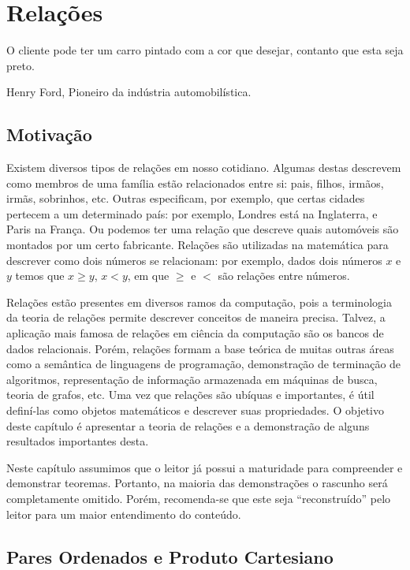 \chapter{Relações}\label{cap7}

\epigraph{O cliente pode ter um carro pintado com a cor que desejar,
  contanto que esta seja preto.}{Henry Ford, Pioneiro da indústria automobilística.}


\section{Motivação}

Existem diversos tipos de relações em nosso cotidiano. Algumas destas
descrevem como membros de uma família estão relacionados entre si:
pais, filhos, irmãos, irmãs, sobrinhos, etc. Outras especificam, por
exemplo, que certas cidades pertecem a um determinado país:
por exemplo, Londres está na Inglaterra, e Paris na França. Ou podemos
ter uma relação que descreve quais automóveis são montados por um
certo fabricante. Relações são utilizadas na matemática para descrever
como dois números se relacionam: por exemplo, dados dois números $x$ e
$y$ temos que $x \geq y$, $x < y$, em que $\geq$ e $<$ são relações
entre números.

Relações estão presentes em diversos ramos da computação, pois a
terminologia da teoria de relações permite descrever conceitos de
maneira precisa. Talvez, a aplicação mais famosa de relações em
ciência da computação são os bancos de dados relacionais. Porém,
relações formam a base teórica de muitas outras áreas como a semântica
de linguagens de programação, demonstração de terminação de
algoritmos, representação de informação armazenada em máquinas de
busca, teoria de grafos, etc. Uma vez que relações são ubíquas e
importantes, é útil definí-las como objetos matemáticos e descrever
suas propriedades. O objetivo deste capítulo é apresentar a teoria de
relações e a demonstração de alguns resultados importantes desta.

\begin{Remark}
Neste capítulo assumimos que o leitor já possui a maturidade para
compreender e demonstrar teoremas. Portanto, na maioria das
demonstrações o rascunho será completamente omitido. Porém,
recomenda-se que este seja ``reconstruído'' pelo leitor para um maior
entendimento do conteúdo.
\end{Remark}

\section{Pares Ordenados e Produto Cartesiano}

